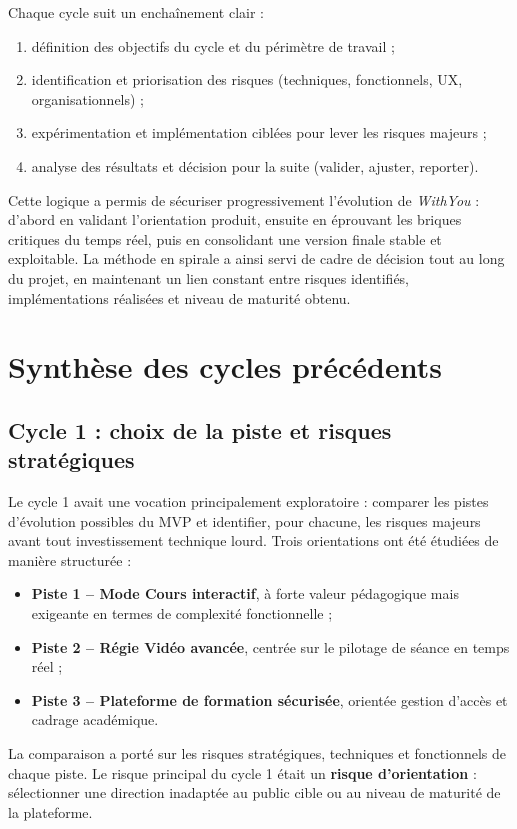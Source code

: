 \documentclass[11pt,a4paper]{report}
\begin{document}
Chaque cycle suit un enchaînement clair :
\begin{enumerate}
    \item définition des objectifs du cycle et du périmètre de travail ;
    \item identification et priorisation des risques (techniques, fonctionnels, UX, organisationnels) ;
    \item expérimentation et implémentation ciblées pour lever les risques majeurs ;
    \item analyse des résultats et décision pour la suite (valider, ajuster, reporter).
\end{enumerate}

Cette logique a permis de sécuriser progressivement l'évolution de \textit{WithYou} : d'abord en validant l'orientation produit, ensuite en éprouvant les briques critiques du temps réel, puis en consolidant une version finale stable et exploitable. La méthode en spirale a ainsi servi de cadre de décision tout au long du projet, en maintenant un lien constant entre risques identifiés, implémentations réalisées et niveau de maturité obtenu.

\chapter[Synthèse cycles précédents]{Synthèse des cycles précédents}
\section[Cycle 1 : choix de la piste]{Cycle 1 : choix de la piste et risques stratégiques}
Le cycle 1 avait une vocation principalement exploratoire : comparer les pistes d'évolution possibles du MVP et identifier, pour chacune, les risques majeurs avant tout investissement technique lourd. Trois orientations ont été étudiées de manière structurée :
\begin{itemize}
    \item \textbf{Piste 1 -- Mode Cours interactif}, à forte valeur pédagogique mais exigeante en termes de complexité fonctionnelle ;
    \item \textbf{Piste 2 -- Régie Vidéo avancée}, centrée sur le pilotage de séance en temps réel ;
    \item \textbf{Piste 3 -- Plateforme de formation sécurisée}, orientée gestion d'accès et cadrage académique.
\end{itemize}

La comparaison a porté sur les risques stratégiques, techniques et fonctionnels de chaque piste. Le risque principal du cycle 1 était un \textbf{risque d'orientation} : sélectionner une direction inadaptée au public cible ou au niveau de maturité de la plateforme.
\end{document}
